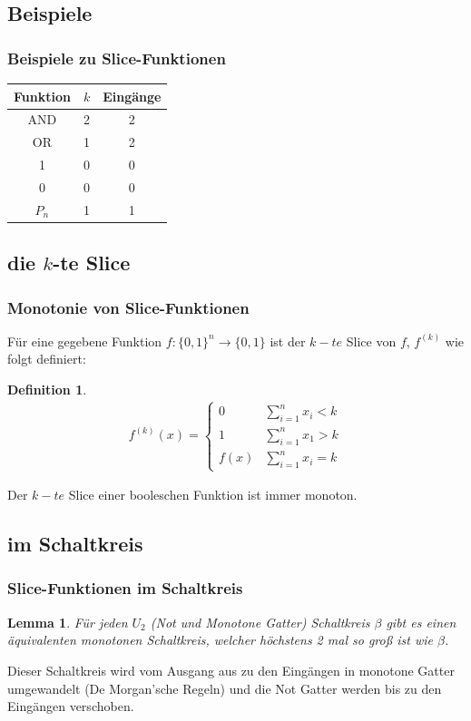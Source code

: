 \documentclass[hyperref={pdfpagelabels=false}]{beamer} %
\newtheorem{defin}{Definition}
\newtheorem{lem}{Lemma}
\begin{document}
  \subsection{Beispiele}
  \begin{frame}
    \frametitle{Beispiele zu Slice-Funktionen}
      \begin{tabular}[t]{|c|c|c|} \hline
        Funktion  & $k$   & Eing\"ange\\ \hline
        AND       & 2     & 2\\
        OR        & 1     & 2\\
        1         & 0     & 0\\
        0         & 0     & 0\\
        $P_{n}$     & 1     & 1\\ \hline
      \end{tabular}
  \end{frame}


  \subsection*{die $k$-te Slice}
  \begin{frame}
    \frametitle{Monotonie von Slice-Funktionen}
    Für eine gegebene Funktion $f:\{0,1\}^n \rightarrow \{0,1\}$ ist der $k-te$ Slice von $f$, $f^{(k)}$ wie folgt definiert:\\
    \begin{defin}
      \begin{align*}
        f^{(k)}(x) =
        \begin{cases}
          0 & \sum\nolimits_{i=1}^{n} x_i < k\\
          1 & \sum\nolimits_{i=1}^{n} x_1 > k\\
          f(x) & \sum\nolimits_{i=1}^{n} x_i = k %
        \end{cases}
      \end{align*}
    \end{defin}
    Der $k-te$ Slice einer booleschen Funktion ist immer monoton.
  \end{frame}

  \subsection{im Schaltkreis}
  \begin{frame}%
    \frametitle{Slice-Funktionen im Schaltkreis}
    \begin{lem}
      Für jeden $U_2$ (Not und Monotone Gatter) Schaltkreis $\beta$ gibt es einen äquivalenten monotonen Schaltkreis, welcher höchstens
      2 mal so groß ist wie $\beta$.
    \end{lem}
    Dieser Schaltkreis wird vom Ausgang aus zu den Eing\"angen in monotone Gatter umgewandelt (De Morgan’sche Regeln) und die Not Gatter werden bis zu den Eing\"angen verschoben.
  \end{frame}
\end{document}
